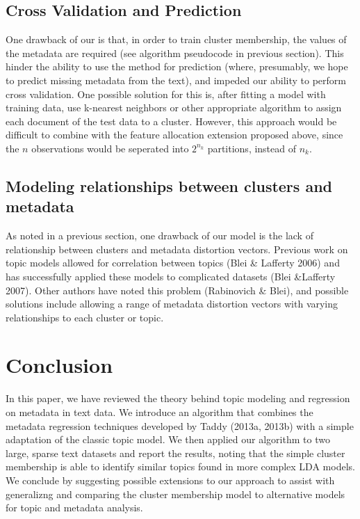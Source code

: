 \documentclass[12pt]{article}
\begin{document}
\subsection{Cross Validation and Prediction}
One drawback of our is that, in order to train cluster membership, the values of the metadata are required (see algorithm pseudocode in previous section). This hinder the ability to use the method for prediction (where, presumably, we hope to predict missing metadata from the text), and impeded our ability to perform cross validation. One possible solution for this is, after fitting a model with training data, use k-nearest neighbors or other appropriate algorithm to assign each document of the test data to a cluster. However, this approach would be difficult to combine with the feature allocation extension proposed above, since the $n$ observations would be seperated into $2^{n_k}$ partitions, instead of $n_k$. 

\subsection{Modeling relationships between clusters and metadata}
As noted in a previous section, one drawback of our model is the lack of relationship between clusters and metadata distortion vectors. 
Previous work on topic models allowed for correlation between topics (Blei \& Lafferty 2006) and has successfully applied these models to complicated datasets (Blei \&Lafferty 2007).
Other authors have noted this problem (Rabinovich \& Blei), and possible solutions include allowing a range of metadata distortion vectors with varying relationships to each cluster or topic. 


\section{Conclusion}\label{conclusion}

In this paper, we have reviewed the theory behind topic modeling and regression on metadata in text data. 
We introduce an algorithm that combines the metadata regression techniques developed by Taddy (2013a, 2013b) with a simple adaptation of the classic topic model.
We then applied our algorithm to two large, sparse text datasets and report the results, noting that the simple cluster membership is able to identify similar topics found in more complex LDA models. 
We conclude by suggesting possible extensions to our approach to assist with generalizng and comparing the cluster membership model to alternative models for topic and metadata analysis. 
\end{document}

